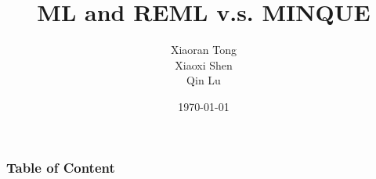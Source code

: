 \documentclass{beamer}
\title[Kernel Genomics]{ML and REML v.s. MINQUE}
\author{Xiaoran Tong\\ Xiaoxi Shen \\ Qin Lu} %
\institute[EPI Biosta, MSU] %
{
  Michigan State University \\ %
  \medskip
  \textit{tongxia1@msu.edu} \\%
  \textit{qlu@epi.msu.edu} %
}
\date{\today} %
\begin{document}
\begin{frame}
\titlepage %
\end{frame}

\begin{frame}
\frametitle{Table of Content} %
\tableofcontents %
\end{frame}

\end{document}
